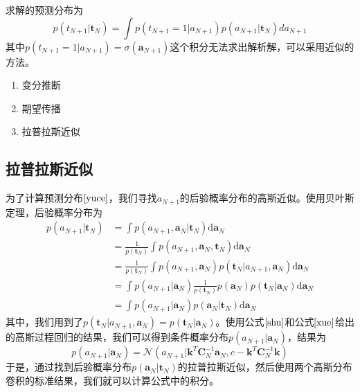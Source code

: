 求解的预测分布为
\begin{equation}
\label{yuce}
	p(t_{N+1}|\boldsymbol{t}_N)=\int p(t_{N+1}=1|a_{N+1})p(a_{N+1}|\boldsymbol{t}_{N})da_{N+1}
\end{equation}
其中$p(t_{N+1}=1|a_{N+1})=\sigma(\boldsymbol{a}_{N+1})$这个积分无法求出解析解，可以采用近似的方法。
\begin{enumerate}
	\item 变分推断
	\item 期望传播
	\item 拉普拉斯近似
\end{enumerate}
\subsection*{拉普拉斯近似}
为了计算预测分布$\ref{yuce}$，我们寻找$a_{N+1}$的后验概率分布的高斯近似。使用贝叶斯定理，后验概率分布为
\begin{equation}
	\begin{aligned}
	\label{he}
	p(a_{N+1}|\boldsymbol{t}_N)&=\int p(a_{N+1},\boldsymbol{a}_N|\boldsymbol{t}_N)\mathrm{d}\boldsymbol{a}_N\\
	&=\frac{1}{p(\boldsymbol{t}_N)}\int p(a_{N+1},\boldsymbol{a}_N,\boldsymbol{t}_N)\mathrm{d}\boldsymbol{a}_N \\
	&=\frac{1}{p(\boldsymbol{t}_N)}\int p(a_{N+1},\boldsymbol{a}_N)p(\boldsymbol{t}_N|a_{N+1},\boldsymbol{a}_N)\mathrm{d}\boldsymbol{a}_N \\
	&=\int p(a_{N+1}|\boldsymbol{a}_N)\frac{1}{p(\boldsymbol{t}_N)}p(\boldsymbol{a}_N)p(\boldsymbol{t}_N|\boldsymbol{a}_N)\mathrm{d}\boldsymbol{a}_N \\
	&=\int p(a_{N+1}|\boldsymbol{a}_N)p(\boldsymbol{a}_N|\boldsymbol{t}_N)\mathrm{d}\boldsymbol{a}_N
	\end{aligned}
\end{equation}
其中，我们用到了$p(\boldsymbol{t}_N|a_{N+1},\boldsymbol{a}_N)=p(\boldsymbol{t}_N|\boldsymbol{a}_N)$。使用公式$\ref{shu}$和公式$\ref{xue}$给出的高斯过程回归的结果，我们可以得到条件概率分布$p(a_{N+1}|\boldsymbol{a}_N)$，结果为
\begin{equation}
\label{jie}
	p(a_{N+1}|\boldsymbol{a}_N)=\mathcal{N}(a_{N+1}|\boldsymbol{k}^T\boldsymbol{C}_N^{-1}\boldsymbol{a}_N,c-\boldsymbol{k}^T\boldsymbol{C}_N^{-1}\boldsymbol{k})
\end{equation}
于是，通过找到后验概率分布$p(\boldsymbol{a}_N|\boldsymbol{t}_N)$的拉普拉斯近似，然后使用两个高斯分布卷积的标准结果，我们就可以计算公式中的积分。

